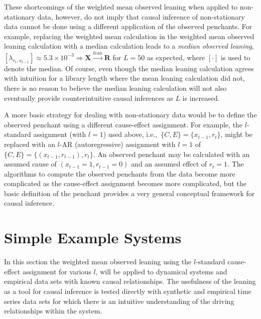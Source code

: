 \documentclass[twocolumn,aps,pre,groupedaddress]{revtex4-1}
\begin{document}
These shortcomings of the weighted mean observed leaning when applied to non-stationary data, however, do not imply that causal inference of non-stationary data cannot be done using a different application of the observed penchants.  For example, replacing the weighted mean calculation in the weighted mean observed leaning calculation with a median calculation leads to a {\em median observed leaning}, $[\lambda_{r_t,x_{t-1}}] \approx 5.3\times 10^{-3}\Rightarrow \mathbf{X}\xrightarrow{lean}\mathbf{R}$ for $L=50$ as expected, where $[\cdot]$ is used to denote the median.  Of course, even though the median leaning calculation agrees with intuition for a library length where the mean leaning calculation did not, there is no reason to believe the median leaning calculation will not also eventually provide counterintuitive causal inferences as $L$ is increased.  

A more basic strategy for dealing with non-stationary data would be to define the observed penchant using a different cause-effect assignment.  For example, the $l$-standard assignment (with $l=1$) used above, i.e.,\ $\{C,E\}=\{x_{t-1},r_t\}$, might be replaced with an $l$-AR (autoregressive) assignment with $l=1$ of $\{C,E\}=\{(x_{t-1},r_{t-1}),r_t\}$.  An observed penchant may be calculated with an assumed cause of $(x_{t-1}=1,r_{t-1}=0)$ and an assumed effect of $r_t = 1$.  The algorithms to compute the observed penchants from the data become more complicated as the cause-effect assignment becomes more complicated, but the basic definition of the penchant provides a very general conceptual framework for causal inference.

\section{Simple Example Systems}
In this section the weighted mean observed leaning using the $l$-standard cause-effect assignment for various $l$, will be applied to dynamical systems and empirical data sets with known causal relationships.  The usefulness of the leaning as a tool for causal inference is tested directly with synthetic and empirical time series data sets for which there is an intuitive understanding of the driving relationships within the system.
\end{document}
